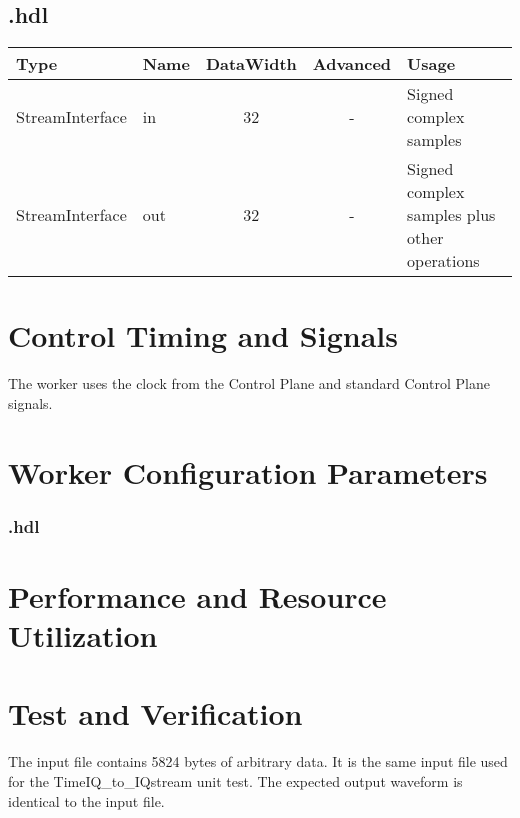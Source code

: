 \begin{landscape}
	\subsection*{\comp.hdl}
	\begin{scriptsize}
		\begin{tabular}{|M{2cm}|M{1.5cm}|c|c|M{12cm}|}
			\hline
			Type            & Name & DataWidth & Advanced   & Usage                                    		\\
			\hline
			StreamInterface & in   & 32        & - 			& Signed complex samples 						\\
			\hline
			StreamInterface & out  & 32        & - 			& Signed complex samples plus other operations	\\
			\hline
		\end{tabular}
	\end{scriptsize}
\end{landscape}

\section*{Control Timing and Signals}
\begin{flushleft}
	The \comp worker{} uses the clock from the Control Plane and standard Control Plane signals.\\
\end{flushleft}

\begin{landscape}
\section*{Worker Configuration Parameters}
\subsubsection*{\comp.hdl}

\section*{Performance and Resource Utilization}

\end{landscape}

\section*{Test and Verification}
\begin{flushleft}
	The input file contains 5824 bytes of arbitrary data. It is the same input file used for the TimeIQ\_to\_IQstream unit test. The expected output waveform is identical to the input file.
\end{flushleft}

